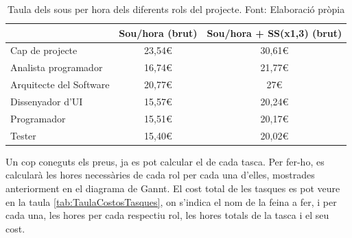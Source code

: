 \documentclass[a4paper]{article}
\begin{document}
\begin{table}[H]
    \begin{center}
        \begin{tabular}{|l|c|c|}
            \hline
            \rowcolor[HTML]{9B9B9B} 
            \multicolumn{1}{|c|}{\cellcolor[HTML]{9B9B9B}{\color[HTML]{000000} \textbf{Rol}}} & {\color[HTML]{000000} \textbf{Sou/hora (brut)}} & {\color[HTML]{000000} \textbf{Sou/hora + SS(x1,3) (brut)}} \\ \hline
            {\color[HTML]{000000} Cap de projecte}                                            & {\color[HTML]{000000} 23,54€}                   & {\color[HTML]{000000} 30,61€}                              \\ \hline
            {\color[HTML]{000000} Analista programador}                                       & {\color[HTML]{000000} 16,74€}                   & {\color[HTML]{000000} 21,77€}                              \\ \hline
            {\color[HTML]{000000} Arquitecte del Software}                                    & {\color[HTML]{000000} 20,77€}                   & {\color[HTML]{000000} 27€}                                 \\ \hline
            {\color[HTML]{000000} Dissenyador d'UI}                                           & {\color[HTML]{000000} 15,57€}                   & {\color[HTML]{000000} 20,24€}                              \\ \hline
            {\color[HTML]{000000} Programador}                                                & {\color[HTML]{000000} 15,51€}                   & {\color[HTML]{000000} 20,17€}                              \\ \hline
            {\color[HTML]{000000} Tester}                                                     & {\color[HTML]{000000} 15,40€}                   & {\color[HTML]{000000} 20,02€}                              \\ \hline
        \end{tabular}
        \caption[Taula dels sous per hora dels diferents rols del projecte]{Taula dels sous per hora dels diferents rols del projecte. Font: Elaboració pròpia}
        \label{tab:TaulaSouRols}
    \end{center}
\end{table}

Un cop coneguts els preus, ja es pot calcular el de cada tasca. Per fer-ho, es calcularà les hores necessàries de cada rol per cada una d'elles, mostrades anteriorment en el diagrama de Gannt. El cost total de les tasques es pot veure en la taula \ref{tab:TaulaCostosTasques}, on s'indica el nom de la feina a fer, i per cada una, les hores per cada respectiu rol, les hores totals de la tasca i el seu cost.
\end{document}
